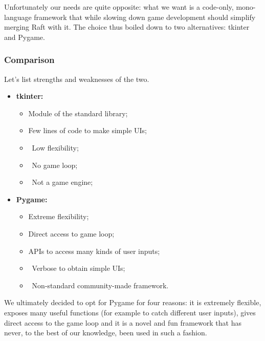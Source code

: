 Unfortunately our needs are quite opposite: what we want is a code-only, mono-language framework that while slowing down game development should simplify merging Raft with it. The choice thus boiled down to two alternatives: tkinter and Pygame. 

\subsubsection{Comparison}

Let's list strengths and weaknesses of the two.

\begin{itemize}
  \item \textbf{tkinter:} 
    \begin{itemize} 
      \item \faThumbsUp[regular] Module of the standard library;
      \item \faThumbsUp[regular] Few lines of code to make simple UIs;
      \item \faThumbsDown\ Low flexibility;
      \item \faThumbsDown\ No game loop;
      \item \faThumbsDown\ Not a game engine;
    \end{itemize}
  \item \textbf{Pygame:}
    \begin{itemize}
      \item \faThumbsUp[regular] Extreme flexibility;
      \item \faThumbsUp[regular] Direct access to game loop;
      \item \faThumbsUp[regular] APIs to access many kinds of user inputs;
      \item \faThumbsDown\ Verbose to obtain simple UIs;
      \item \faThumbsDown\ Non-standard community-made framework.
    \end{itemize}
\end{itemize}

We ultimately decided to opt for Pygame for four reasons: it is extremely flexible, exposes many useful functions (for example to catch different user inputs), gives direct access to the game loop and it is a novel and fun framework that has never, to the best of our knowledge, been used in such a fashion. 